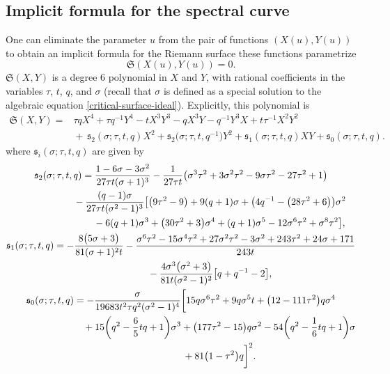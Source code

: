 \documentclass[10pt,a4paper]{amsart}
\numberwithin{equation}{section}
\begin{document}
\subsection{Implicit formula for the spectral curve}
One can eliminate the parameter $u$ from the pair of functions $(X(u),Y(u))$ to obtain an implicit formula for the Riemann surface these functions parametrize
 \begin{equation*}
 \mathfrak{S}(X(u),Y(u)) = 0.
 \end{equation*}
$\mathfrak{S}(X,Y)$ is a degree $6$ polynomial in $X$ and $Y$, with rational coefficients in the variables $\tau$, $t$, $q$, and $\sigma$ (recall that $\sigma$ is defined as a special solution to the algebraic equation \eqref{critical-surface-ideal}). Explicitly, this polynomial is
 \begin{align*}
 \mathfrak{S}(X,Y)={}& \tau q X^4 + \tau q^{-1}Y^4 -tX^3Y^3 - qX^3Y - q^{-1}Y^3X + t\tau^{-1}X^2Y^2\\
 &{}{+}\, \mathfrak{s}_2(\sigma;\tau,t,q) X^2 + \mathfrak{s}_2\bigl(\sigma;\tau,t,q^{-1}\bigr) Y^2 + \mathfrak{s}_1(\sigma;\tau,t,q) XY + \mathfrak{s}_0(\sigma;\tau,t,q).\nonumber
 \end{align*}
where $\mathfrak{s}_i(\sigma;\tau,t,q)$ are given by
 \begin{gather*}
 \mathfrak{s}_2(\sigma;\tau,t,q) = \frac{1-6\sigma-3\sigma^2}{27\tau t (\sigma+1)^3} - \frac{1}{27\tau t}\bigl(\sigma^{3} \tau^{2}+3 \sigma^{2} \tau^{2}-9 \sigma \tau^{2}-27 \tau^{2}+1\bigr) \nonumber\\
 \hphantom{\mathfrak{s}_2(\sigma;\tau,t,q) =}{}
 -\frac{(q-1)\sigma}{27\tau t(\sigma^2 - 1)^3}\bigl[\bigl(9 \tau^{2}-9\bigr)+9(q+1) \sigma +\bigl(4q^{-1}-\bigl(28 \tau^{2}+6\bigr) \bigr) \sigma^{2} \\
 \hphantom{\mathfrak{s}_2(\sigma;\tau,t,q) =}\qquad{}
 -6(q+1 ) \sigma^{3}+\bigl(30 \tau^{2}+3\bigr)\sigma^{4}+(q+1) \sigma^{5}-12\sigma^{6} \tau^{2}+\sigma^{8} \tau^{2}\bigr]\nonumber,\\
 \mathfrak{s}_1(\sigma;\tau,t,q) = -\frac{8 \bigl(5 \sigma +3\bigr)}{81 (\sigma +1)^{2} t} -\frac{\sigma^{6} \tau^{2}-15 \sigma^{4} \tau^{2}+27 \sigma^{2} \tau^{2}-3 \sigma^{2}+243 \tau^{2}+24 \sigma +171}{243 t}\nonumber\\
 \hphantom{\mathfrak{s}_1(\sigma;\tau,t,q) =}{}
 -\frac{4\sigma^3\bigl(\sigma^2+3\bigr)}{81t(\sigma^2 - 1)^2}\bigl[q+q^{-1}-2\bigr],\\
 \mathfrak{s}_0(\sigma;\tau,t,q) = -\frac{\sigma}{19683t^2\tau q^2(\sigma^2 - 1)^4}\biggl[15 q \sigma^{6} \tau^{2}+9 q \sigma^{5} t +\bigl(12-111 \tau^{2}\bigr) q\sigma^{4} \nonumber \\
 \hphantom{\mathfrak{s}_0(\sigma;\tau,t,q) =}\qquad{}
 +15\biggl(q^{2}-\frac{6}{5}t q +1\biggr) \sigma^{3}+\bigl(177 \tau^{2}-15\bigr) q \sigma^{2}-54\biggl(q^{2}-\frac{1}{6}t q +1\biggr) \sigma\nonumber\\
 \hphantom{\mathfrak{s}_0(\sigma;\tau,t,q) =}\qquad{}
 + 81\bigl(1-\tau^{2}\bigr) q\biggr]^2.
 \end{gather*}
\end{document}
